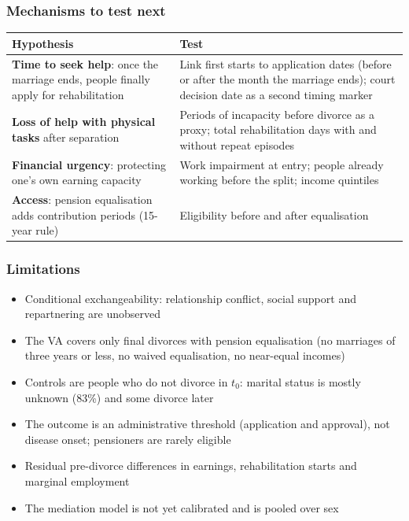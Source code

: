 \documentclass[t,20pt]{beamer}
\begin{document}
\begin{bibframe}
  \frametitle{Mechanisms to test next}
  {\small
  \renewcommand{\arraystretch}{1.35}
  \begin{tabularx}{\linewidth}{@{}>{\raggedright\arraybackslash}p{10.4cm} Y@{}}
    \toprule
    Hypothesis & Test \\
    \midrule
    \textbf{Time to seek help}: once the marriage ends, people finally apply for rehabilitation &
      Link first starts to application dates (before or after the month the marriage ends); court decision date as a second timing marker \\
    \textbf{Loss of help with physical tasks} after separation &
      Periods of incapacity before divorce as a proxy; total rehabilitation days with and without repeat episodes \\
    \textbf{Financial urgency}: protecting one's own earning capacity &
      Work impairment at entry; people already working before the split; income quintiles \\
    \textbf{Access}: pension equalisation adds contribution periods (15-year rule) &
      Eligibility before and after equalisation \\
    \bottomrule
  \end{tabularx}
  }
\end{bibframe}

\begin{bibframe}
  \frametitle{Limitations}
  \begin{itemize}
    \item Conditional exchangeability: relationship conflict, social support and repartnering are unobserved
    \item The VA covers only final divorces with pension equalisation (no marriages of three years or less, no waived equalisation, no near-equal incomes)
    \item Controls are people who do not divorce in $t_0$: marital status is mostly unknown (83\%) and some divorce later
    \item The outcome is an administrative threshold (application and approval), not disease onset; pensioners are rarely eligible
    \item Residual pre-divorce differences in earnings, rehabilitation starts and marginal employment
    \item The mediation model is not yet calibrated and is pooled over sex
  \end{itemize}
\end{bibframe}
\end{document}
